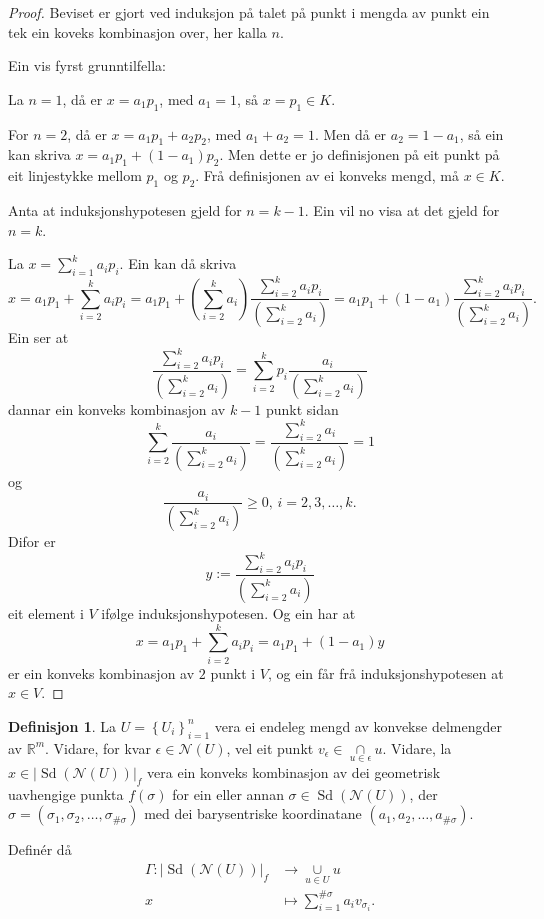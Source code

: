 \documentclass[a4paper, 12pt, norsk]{article}
\theoremstyle{plain}
\theoremstyle{definition}
\newtheorem{definition}[theorem]{Definisjon}
\newcommand{\Rb}{\mathbb{R}}
\newcommand{\Nc}{\mathcal{N}}
\newcommand{\intersect}{ \mathop{\cap}\limits }
\newcommand{\union}{ \mathop{\cup}\limits }
\newcommand{\gr}[1]{ \lvert #1 \rvert } %
\newcommand{\set}[1]{ \left\{ #1 \right\} } %
\newcommand{\tuple}[1]{ \left( #1 \right) } %
\DeclareMathOperator{\Sd}{Sd} %
\begin{document}
\begin{proof}
	Beviset er gjort ved induksjon på talet på punkt i mengda av punkt ein tek ein koveks kombinasjon over, her kalla \( n \).

	Ein vis fyrst grunntilfella:

	La \( n = 1 \), då er \( x = a_1 p_1 \), med \( a_1 = 1 \), så \( x = p_1 \in K \).
	
	For \( n = 2 \), då er \( x = a_1 p_1 + a_2 p_2 \), med \( a_1 + a_2 = 1 \). Men då er \( a_2 = 1 - a_1 \), så ein kan skriva \( x = a_1 p_1 + (1-a_1) p_2 \). Men dette er jo definisjonen på eit punkt på eit linjestykke mellom \( p_1 \) og \( p_2 \). Frå definisjonen av ei konveks mengd, må \( x \in K \).

	Anta at induksjonshypotesen gjeld for \( n = k-1 \). Ein vil no visa at det gjeld for \( n = k \).

	La \( x = \sum_{i=1}^k a_i p_i \). Ein kan då skriva
	\[ 
		x = a_1 p_1 + \sum_{i=2}^k a_i p_i = a_1 p_1 + (\sum_{i=2}^k a_i) \frac{\sum_{i=2}^k a_i p_i}{(\sum_{i=2}^k a_i)} = a_1 p_1 + (1-a_1) \frac{\sum_{i=2}^k a_i p_i}{(\sum_{i=2}^k a_i)}.
	\]
	Ein ser at
	\[
		\frac{\sum_{i=2}^k a_i p_i}{(\sum_{i=2}^k a_i)} = \sum_{i=2}^k p_i\frac{a_i}{(\sum_{i=2}^k a_i)}
	\]
	dannar ein konveks kombinasjon av \( k-1 \) punkt sidan
	\[
		\sum_{i=2}^k \frac{a_i}{(\sum_{i=2}^k a_i)} = \frac{\sum_{i=2}^k a_i}{(\sum_{i=2}^k a_i)} = 1
	\]
	og
	\[
		\frac{a_i}{(\sum_{i=2}^k a_i)} \geq 0, \, i=2,3,\dots,k.
	\]
	Difor er
	\[
		y := \frac{\sum_{i=2}^k a_i p_i}{(\sum_{i=2}^k a_i)}
	\]
	eit element i \( V \) ifølge induksjonshypotesen. Og ein har at
	\[
		x = a_1 p_1 + \sum_{i=2}^k a_i p_i = a_1 p_1 + (1-a_1) y
	\]
	er ein konveks kombinasjon av \( 2 \) punkt i \( V \), og ein får frå induksjonshypotesen at \( x \in V \).
\end{proof}

\begin{definition} \label{thm:Gamma}
	La \( U = \set{U_i}_{i=1}^n \) vera ei endeleg mengd av konvekse delmengder av \( \Rb^m \). Vidare, for kvar \( \epsilon \in \Nc(U) \), vel eit punkt \( v_\epsilon \in \intersect_{u \in \epsilon} u \). Vidare, la \( x \in \gr{\Sd(\Nc(U))}_f \) vera ein konveks kombinasjon av dei geometrisk uavhengige punkta \( f(\sigma) \) for ein eller annan \( \sigma \in \Sd(\Nc(U)) \), der \( \sigma = \tuple{\sigma_1, \sigma_2, \dots, \sigma_{\#\sigma}} \) med dei barysentriske koordinatane \( \tuple{a_1, a_2, \dots, a_{\#\sigma}} \).
	
	Definér då
	\begin{align*}
		\Gamma : \gr{\Sd(\Nc(U))}_f &\to \union_{u \in U} u \\
		x &\mapsto \sum_{i=1}^{\#\sigma} a_i v_{\sigma_i}.
	\end{align*}
\end{definition}
\end{document}
